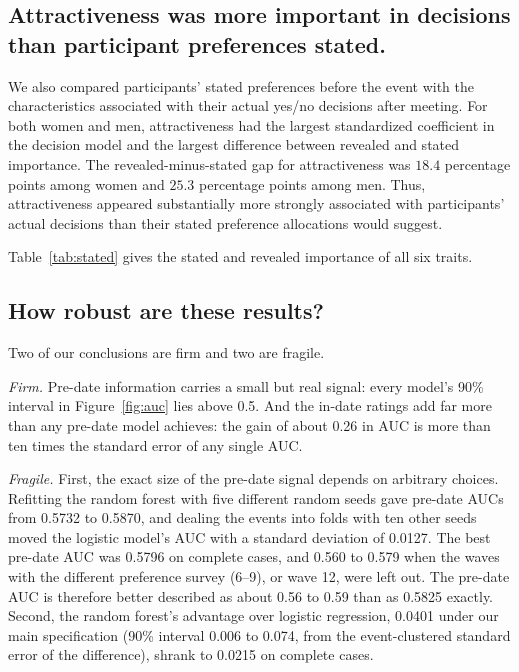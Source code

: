 \documentclass[11pt,letterpaper,reqno]{amsart}
\numberwithin{equation}{subsection}
\theoremstyle{definition}
\numberwithin{thm}{subsection}
\begin{document}
\subsection{Attractiveness was more important in decisions than participant preferences stated.}
We also compared participants' stated preferences before the event with the characteristics associated with their actual yes/no decisions after meeting. For both women and men, attractiveness had the largest standardized coefficient in the decision model and the largest difference between revealed and stated importance. The revealed-minus-stated gap for attractiveness was \(18.4\) percentage points among women and \(25.3\) percentage points among men. Thus, attractiveness appeared substantially more strongly associated with participants' actual decisions than their stated preference allocations would suggest.

Table~\ref{tab:stated} gives the stated and revealed importance of all six traits.



\subsection{How robust are these results?}

Two of our conclusions are firm and two are fragile.

\emph{Firm.} Pre-date information carries a small but real signal: every model's 90\% interval in
Figure~\ref{fig:auc} lies above 0.5. And the in-date ratings add far more than any pre-date model achieves: the gain
of about 0.26 in AUC is more than ten times the standard error of any single AUC.

\emph{Fragile.} First, the exact size of the pre-date signal depends on arbitrary choices. Refitting the random
forest with five different random seeds gave pre-date AUCs from 0.5732 to 0.5870, and dealing the events into folds
with ten other seeds moved the logistic model's AUC with a standard deviation of 0.0127. The best pre-date AUC was
0.5796 on complete cases, and 0.560 to 0.579 when the waves with the different preference survey (6--9), or wave 12,
were left out. The pre-date AUC is therefore better described as about 0.56 to 0.59 than as 0.5825 exactly. Second,
the random forest's advantage over logistic regression, 0.0401 under our main specification (90\% interval 0.006 to
0.074, from the event-clustered standard error of the difference), shrank to 0.0215 on complete cases.
\end{document}
